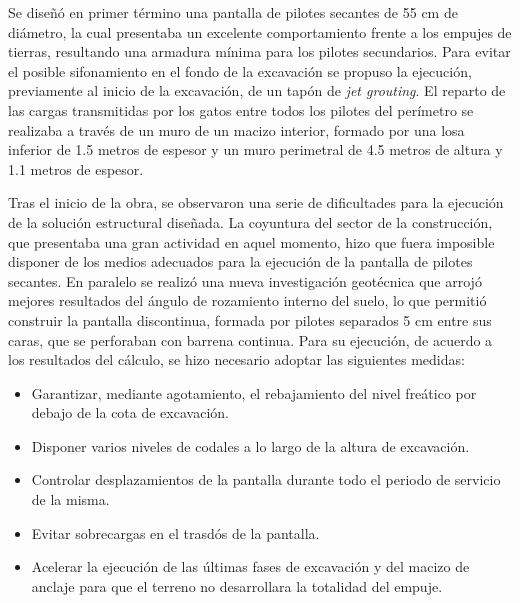 Se diseñó en primer término una pantalla de pilotes secantes de 55 cm de diámetro, la cual presentaba un excelente comportamiento frente a los empujes de tierras, resultando una armadura mínima para los pilotes secundarios. Para evitar el posible sifonamiento en el fondo de la excavación se propuso la ejecución, previamente al inicio de la excavación, de un tapón de \emph{jet grouting}. El reparto de las cargas transmitidas por los gatos entre todos los pilotes del perímetro se realizaba a través de un muro de  un macizo interior, formado por una losa inferior de 1.5 metros de espesor y un muro perimetral de 4.5 metros de altura y 1.1 metros de espesor. 



Tras el inicio de la obra, se observaron una serie de dificultades para la ejecución de la solución estructural diseñada.  La coyuntura del sector de la construcción, que presentaba una gran actividad en aquel momento,  hizo que fuera imposible disponer de los medios adecuados para la ejecución de la pantalla de pilotes secantes.  En paralelo se realizó una nueva investigación geotécnica que arrojó mejores resultados del ángulo de rozamiento interno del suelo, lo que permitió construir la pantalla discontinua, formada por pilotes separados 5 cm entre sus caras, que se perforaban con barrena continua.  Para su ejecución, de acuerdo a los resultados del cálculo, se hizo necesario adoptar las siguientes medidas:

\begin{itemize}
\item Garantizar, mediante agotamiento, el rebajamiento del nivel freático por debajo  de la cota de excavación.
\item Disponer varios niveles de codales a lo largo de la altura de excavación.
\item Controlar desplazamientos de la pantalla durante todo el periodo de servicio de la misma.
\item Evitar sobrecargas en el trasdós de la pantalla.
\item Acelerar la ejecución de las últimas fases de excavación y del macizo de anclaje para que el terreno no desarrollara la totalidad del empuje.
\end{itemize}

